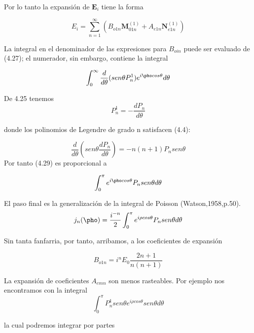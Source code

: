 \documentclass[graybox]{svmult}
\begin{document}
 Por lo tanto la expansión de $\textbf{E}_{i}$ tiene la forma
 
 \begin{equation}
     E_{i}= \sum_{n=1}^{\infty}(B_{o1n} \textbf{M}_{01n}^{(1)}+A_{e1n} \textbf{N}_{e1n}^{(1)})
 \end{equation}
 
 La integral en el denominador de las expresiones para $B_{oin}$ puede ser evaluado de (4.27); el numerador, sin embargo, contiene la integral
 
 \begin{equation}
     \int_{0}^{\infty} \frac{d}{d\theta}(sen\theta P_{n}^{1})e^{i\pho cos\theta}d\theta
 \end{equation}
 
De 4.25 tenemos 
\begin{equation}
    P_{n}^{1}=-\frac{dP_{n}}{d\theta}
\end{equation}

donde los polinomios de Legendre de grado n satisfacen (4.4):

\begin{equation}
    \frac{d}{d\theta}(sen\theta \frac{dP_{n}}{d\theta})=-n(n+1)P_{n}sen\theta
\end{equation}
Por tanto (4.29) es proporcional a

\begin{equation}
    \int_{0}^{\pi} e^{i\pho cos\theta}P_{n}sen\theta d\theta
\end{equation}

El paso final es la generalización de la integral de Poisson (Watson,1958,p.50).
\begin{equation}
j_{n}(\pho)=\frac{i^{-n}}{2} \int_{0}^{\pi} e^{i\rho cos\theta}P_{n}sen\theta d\theta   
\end{equation}

Sin tanta fanfarria, por tanto, arribamos, a los coeficientes de expansión

\begin{equation}
    B_{o1n}=i^{n}E_{0}\frac{2n+1}{n(n+1)}
\end{equation}

La expansión de coeficientes $A_{emn}$ son menos rasteables. Por ejemplo nos encontramos con la integral
\begin{equation}
    \int_{0}^{\pi} P_{n}^{1} sen\theta e^{i\rho cos\theta}sen\theta d\theta
\end{equation}

la cual podremos integrar por partes
\end{document}
